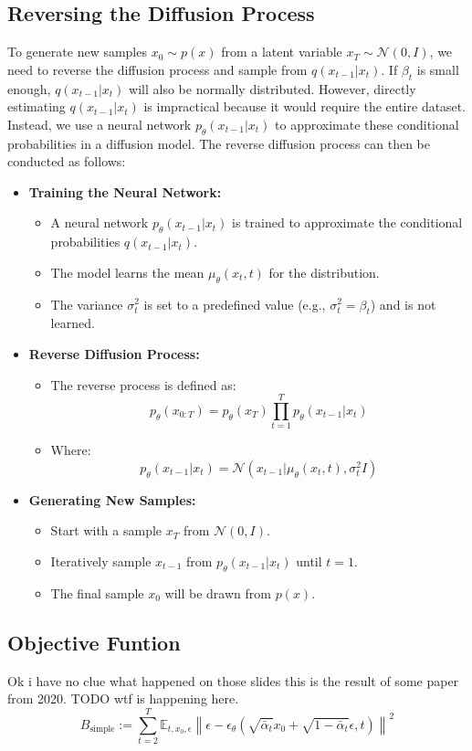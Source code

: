 \documentclass[a4paper]{article}
\begin{document}
\subsection{Reversing the Diffusion Process}

To generate new samples \( x_0 \sim p(x) \) from a latent variable \( x_T \sim \mathcal{N}(0, I) \), we need to reverse the diffusion process and sample from \( q(x_{t-1} | x_t) \). If \( \beta_t \) is small enough, \( q(x_{t-1} | x_t) \) will also be normally distributed. However, directly estimating \( q(x_{t-1} | x_t) \) is impractical because it would require the entire dataset. Instead, we use a neural network \( p_\theta(x_{t-1} | x_t) \) to approximate these conditional probabilities in a diffusion model. The reverse diffusion process can then be conducted as follows:

\begin{itemize}
    \item \textbf{Training the Neural Network:}
    \begin{itemize}
        \item A neural network \( p_\theta(x_{t-1} | x_t) \) is trained to approximate the conditional probabilities \( q(x_{t-1} | x_t) \).
        \item The model learns the mean \( \mu_\theta(x_t, t) \) for the distribution.
        \item The variance \( \sigma_t^2 \) is set to a predefined value (e.g., \( \sigma_t^2 = \beta_t \)) and is not learned.
    \end{itemize}

    \item \textbf{Reverse Diffusion Process:}
    \begin{itemize}
        \item The reverse process is defined as:
        \[
        p_\theta(x_{0:T}) = p_\theta(x_T) \prod_{t=1}^{T} p_\theta(x_{t-1} | x_t)
        \]
        \item Where:
        \[
        p_\theta(x_{t-1} | x_t) = \mathcal{N}(x_{t-1} | \mu_\theta(x_t, t), \sigma_t^2 I)
        \]
    \end{itemize}
    
    \item \textbf{Generating New Samples:}
    \begin{itemize}
        \item Start with a sample \( x_T \) from \( \mathcal{N}(0, I) \).
        \item Iteratively sample \( x_{t-1} \) from \( p_\theta(x_{t-1} | x_t) \) until \( t = 1 \).
        \item The final sample \( x_0 \) will be drawn from \( p(x) \).
    \end{itemize}
\end{itemize}
\subsection{Objective Funtion}
Ok i have no clue what happened on those slides this is the result of some paper from 2020. TODO wtf is happening here.
\[
B_{\text{simple}} := \sum_{t=2}^{T} \mathbb{E}_{t, x_0, \epsilon} \left\| \epsilon - \epsilon_\theta \left( \sqrt{\bar{\alpha}_t} x_0 + \sqrt{1 - \bar{\alpha}_t} \epsilon, t \right) \right\|^2
\]
\end{document}
